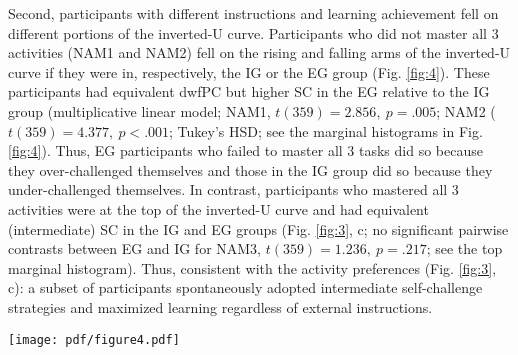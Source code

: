     Second, participants with different instructions and learning achievement fell on different portions of the inverted-U curve. Participants who did not master all 3 activities  (NAM1 and NAM2) fell on the rising and falling arms of the inverted-U curve if they were in, respectively, the IG or the EG group (Fig. \ref{fig:4}). These participants had equivalent dwfPC but higher SC in the EG relative to the IG group (multiplicative linear model;  NAM1, $t(359) = 2.856,\ p = .005$; NAM2 ($t(359) = 4.377,\ p < .001$; Tukey's HSD; see the marginal histograms in Fig. \ref{fig:4}). Thus, EG participants who failed to master all 3 tasks did so because they over-challenged themselves and those in the IG group did so because they under-challenged themselves. In contrast, participants who mastered all 3 activities were at the top of the inverted-U curve and had equivalent (intermediate) SC in the IG and EG groups (Fig. \ref{fig:3}, c; no significant pairwise contrasts between EG and IG for NAM3, $t(359) = 1.236,\ p = .217$; see the top marginal histogram). Thus, consistent with the activity preferences (Fig. \ref{fig:3}, c): a subset of participants spontaneously adopted intermediate self-challenge strategies and maximized learning regardless of external instructions. 
    
    \begin{figure*}[t]
        \centering
        \texttt{[image: pdf/figure4.pdf]}
        \caption{Relationship between activity choices and final performance. The scatter plot shows the difficulty-weighted final score (dwfPC; $y$-axis) as a function of the self-challenge index (SC; $x$-axis). Each point is one participant. Colors indicate the number of activities mastered: NAM1, $N=99$ ($N_{\mathrm{EG}}=42$; $N_{\mathrm{IG}}=57$); NAM2, $N=126$ ($N_{\mathrm{EG}}=58$; $N_{\mathrm{IG}}=68$); and NAM3, $N=140$ ($N_{\mathrm{EG}}=88$; $N_{\mathrm{IG}}=52$); filled and unfilled circles indicate, respectively, EG ($N=188$) and IG ($N=177$) groups. The black curve shows the line of best fit from a linear-quadratic regression model, with $95\%$ confidence intervals represented by the strip surrounded by black dashed lines. The marginal histograms on the top show the distributions of SC scores for each NAM (color) and group (solid and dashed traces). SC was higher for EG relative to IG groups in participants who mastered only 1 or 2 activities (NAM1 and NAM2), and was equivalent, with intermediate values, for participants who mastered all 3 activities (NAM3; top histogram). Source data are provided as a Source Data file.}
        \label{fig:4}
    \end{figure*}

